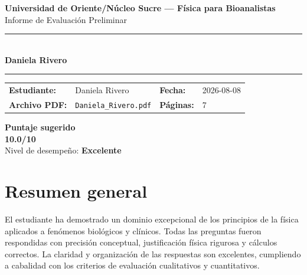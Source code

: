 \documentclass[11pt,a4paper]{article}
\begin{document}
\begin{center}
  {\Large\bfseries\color{azulTitulo} Universidad de Oriente/Núcleo Sucre --- Física para Bioanalistas}\\[4pt]
  {\large Informe de Evaluación Preliminar}\\[12pt]
  \rule{\linewidth}{1.2pt}\\[6pt]
  {\LARGE\bfseries Daniela Rivero}\\[4pt]
  \rule{\linewidth}{0.6pt}
\end{center}

\vspace{4pt}
\begin{tcolorbox}[cajaTitulo, title=Datos del informe]
\begin{tabular}{@{}llll@{}}
  \textbf{Estudiante:}  & Daniela Rivero  &
  \textbf{Fecha:}       & 2026-08-08 \\[4pt]
  \textbf{Archivo PDF:} & \texttt{Daniela\_Rivero.pdf}  &
  \textbf{Páginas:}     & 7 \\
\end{tabular}
\end{tcolorbox}

\vspace{6pt}
\begin{center}
  \begin{tcolorbox}[
    enhanced,
    colback=white, colframe=desempeno_excelente,
    width=0.62\linewidth,
    boxrule=2pt,
    halign=center, valign=center,
    top=8pt, bottom=8pt,
  ]
    \centering
    {\large\bfseries Puntaje sugerido}\\[6pt]
    {\Huge\bfseries\color{desempeno_excelente} 10.0/10}\\[6pt]
    {\large Nivel de desempeño: \textbf{\color{desempeno_excelente} Excelente}}
  \end{tcolorbox}
\end{center}

\section*{Resumen general}
El estudiante ha demostrado un dominio excepcional de los principios de la física aplicados a fenómenos biológicos y clínicos. Todas las preguntas fueron respondidas con precisión conceptual, justificación física rigurosa y cálculos correctos. La claridad y organización de las respuestas son excelentes, cumpliendo a cabalidad con los criterios de evaluación cualitativos y cuantitativos.
\end{document}
